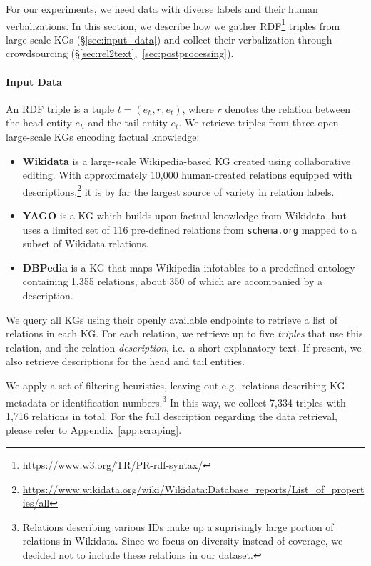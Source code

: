For our experiments, we need data with diverse labels and their human verbalizations. In this section, we describe how we gather RDF\footnote{\url{https://www.w3.org/TR/PR-rdf-syntax/}} triples from large-scale KGs (§\ref{sec:input_data}) and collect their verbalization through crowdsourcing (§\ref{sec:rel2text},\ \ref{sec:postprocessing}).

\paragraph{Input Data}
An RDF triple is a tuple $t = (e_h, r, e_t)$, where $r$ denotes the relation between the head entity $e_h$ and the tail entity $e_t$.
We retrieve triples from three open large-scale KGs encoding factual knowledge:

\begin{itemize}
    \item \textbf{Wikidata} \cite{vrandevcic2014wikidata} is a large-scale Wikipedia-based KG created using collaborative editing. With approximately 10,000 human-created relations equipped with descriptions,\footnote{\url{https://www.wikidata.org/wiki/Wikidata:Database_reports/List_of_properties/all}} it is by far the largest source of variety in relation labels.
    \item \textbf{YAGO} \cite{pellissier2020yago} is a KG which builds upon factual knowledge from Wikidata, but uses a limited set of 116 pre-defined relations from \texttt{schema.org} \cite{guha2016schema} mapped to a subset of Wikidata relations.
    \item \textbf{DBPedia} \cite{lehmann2015dbpedia} is a KG that maps Wikipedia infotables to a predefined ontology containing 1,355 relations, about 350 of which are accompanied by a description.
\end{itemize}

We query all KGs using their openly available endpoints to retrieve a list of relations in each KG. For each relation, we retrieve up to five \textit{triples} that use this relation, and the relation \textit{description}, i.e.\ a short explanatory text.
If present, we also retrieve descriptions for the head and tail entities.

We apply a set of filtering heuristics, leaving out e.g.\ relations describing KG metadata or identification numbers.\footnote{Relations describing various IDs make up a suprisingly large portion of relations in Wikidata. Since we focus on diversity instead of coverage, we decided not to include these relations in our dataset.} In this way, we collect 7,334 triples with 1,716 relations in total. For the full description regarding the data retrieval, please refer to Appendix~\ref{app:scraping}.

